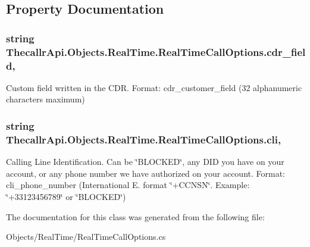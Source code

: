 \subsection{Property Documentation}
\hypertarget{class_thecallr_api_1_1_objects_1_1_real_time_1_1_real_time_call_options_a46e7363807c6216dd46bb2d3eb740706}{
\subsubsection[{cdr\+\_\+field}]{\setlength{\rightskip}{0pt plus 5cm}string Thecallr\+Api.\+Objects.\+Real\+Time.\+Real\+Time\+Call\+Options.\+cdr\+\_\+field\hspace{0.3cm}{\ttfamily [get]}, {\ttfamily [set]}}}\label{class_thecallr_api_1_1_objects_1_1_real_time_1_1_real_time_call_options_a46e7363807c6216dd46bb2d3eb740706}


Custom field written in the C\+D\+R. Format\+: cdr\+\_\+customer\+\_\+field (32 alphanumeric characters maximum) 

\hypertarget{class_thecallr_api_1_1_objects_1_1_real_time_1_1_real_time_call_options_a1f37dc77ec44c7d4e18d42dda83ceec4}{
\subsubsection[{cli}]{\setlength{\rightskip}{0pt plus 5cm}string Thecallr\+Api.\+Objects.\+Real\+Time.\+Real\+Time\+Call\+Options.\+cli\hspace{0.3cm}{\ttfamily [get]}, {\ttfamily [set]}}}\label{class_thecallr_api_1_1_objects_1_1_real_time_1_1_real_time_call_options_a1f37dc77ec44c7d4e18d42dda83ceec4}


Calling Line Identification. Can be \char`\"{}\+B\+L\+O\+C\+K\+E\+D\char`\"{}, any D\+I\+D you have on your account, or any phone number we have authorized on your account. Format\+: cli\+\_\+phone\+\_\+number (International E. format \char`\"{}+\+C\+C\+N\+S\+N\char`\"{}. Example\+: \char`\"{}+33123456789\char`\"{} or \char`\"{}\+B\+L\+O\+C\+K\+E\+D\char`\"{}) 



The documentation for this class was generated from the following file\+:\begin{DoxyCompactItemize}
\item 
Objects/\+Real\+Time/Real\+Time\+Call\+Options.\+cs\end{DoxyCompactItemize}
